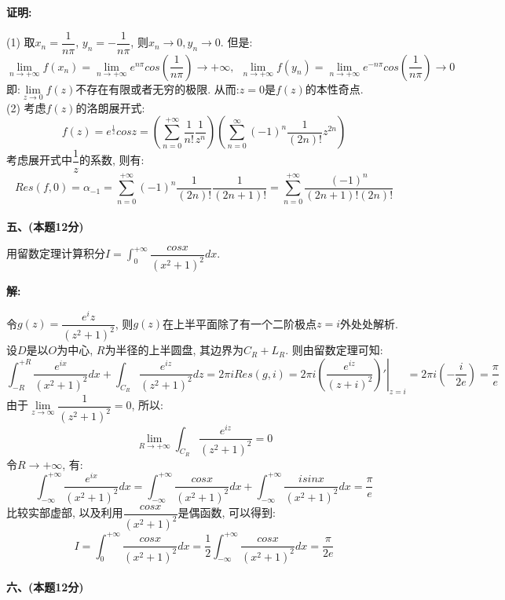 \documentclass{article}
\begin{document}
\textbf{证明:}

(1) 取$x_n = \dfrac{1}{n\pi}$, $y_n = -\dfrac{1}{n\pi}$, 则$x_n \rightarrow 0, y_n \rightarrow 0$. 但是:
$$ \lim\limits_{n \rightarrow +\infty} f(x_n) =  \lim\limits_{n \rightarrow +\infty} e^{n\pi} cos(\frac{1}{n\pi}) \rightarrow + \infty, \ \ \lim\limits_{n \rightarrow +\infty} f(y_n) =  \lim\limits_{n \rightarrow +\infty} e^{-n\pi} cos(\frac{1}{n\pi}) \rightarrow 0 $$
即:$\lim\limits_{z \rightarrow 0} f(z)$不存在有限或者无穷的极限. 从而:$z=0$是$f(z)$的本性奇点.\\

(2) 考虑$f(z)$的洛朗展开式:
$$ f(z) =  e^{\frac{1}{z}}cosz = \left(\sum\limits_{n=0}^{+\infty} \dfrac{1}{n!} \dfrac{1}{z^n} \right) \left(\sum\limits_{n=0}^{\infty}(-1)^n \dfrac{1}{(2n)!} z^{2n}  \right)  $$
考虑展开式中$\dfrac{1}{z}$的系数, 则有:
$$ Res(f, 0) = \alpha_{-1} = \sum\limits_{n=0}^{+\infty} (-1)^n \dfrac{1}{(2n)!} \dfrac{1}{(2n+1)!} = \sum\limits_{n=0}^{+\infty} \dfrac{(-1)^n}{(2n+1)!(2n)!} $$ \\ 

\textbf{五、(本题12分)}

用留数定理计算积分$I = \displaystyle{\int_0^{+\infty} \dfrac{cosx}{(x^2 + 1)^2} dx}$. 

\textbf{解:} 

令$g(z) = \dfrac{e^iz}{(z^2 + 1)^2}$, 则$g(z)$在上半平面除了有一个二阶极点$z = i$外处处解析. 设$D$是以$O$为中心, $R$为半径的上半圆盘, 其边界为$C_R + L_R$. 则由留数定理可知:
$$ \displaystyle{\int_{-R}^{+R} \dfrac{e^{ix}}{(x^2 + 1)^2} dx} + \displaystyle{\int_{C_R} \dfrac{e^{iz}}{(z^2 + 1)^2} dz} = 2\pi i Res(g, i) = 2\pi i \left.\left(\dfrac{e^{iz}}{(z+i)^2} \right)'\right|_{z=i} = 2\pi i \left( -\dfrac{i}{2e} \right) = \dfrac{\pi}{e}$$
由于$\lim\limits_{z \rightarrow \infty} \dfrac{1}{(z^2 + 1)^2} = 0$, 所以:
$$ \lim\limits_{R \rightarrow +\infty} \displaystyle{ \int_{C_R}\dfrac{e^{iz}}{(z^2 + 1)^2}} = 0 $$
令$R \rightarrow +\infty$, 有:
$$  \displaystyle{\int_{-\infty}^{+\infty} \dfrac{e^{ix}}{(x^2 + 1)^2} dx} =  \displaystyle{\int_{-\infty}^{+\infty} \dfrac{cosx}{(x^2 + 1)^2} dx} + \displaystyle{\int_{-\infty}^{+\infty} \dfrac{isinx}{(x^2 + 1)^2} dx} =\dfrac{\pi}{e} $$
比较实部虚部, 以及利用$\dfrac{cosx}{(x^2 + 1)^2}$是偶函数, 可以得到:
$$ I = \displaystyle{\int_0^{+\infty} \dfrac{cosx}{(x^2 + 1)^2} dx} = \dfrac{1}{2}\displaystyle{\int_{-\infty}^{+\infty} \dfrac{cosx}{(x^2 + 1)^2}dx} = \dfrac{\pi}{2e} $$ \\ 


\textbf{六、(本题12分)}
\end{document}

